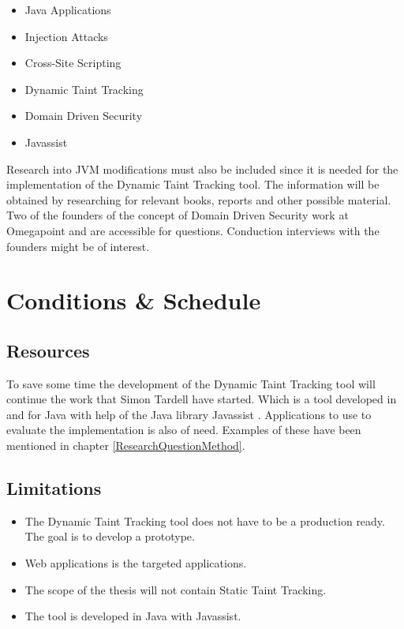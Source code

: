 \documentclass{../kththesis}
\begin{document}
		\begin{itemize}  
			\item Java Applications
			\item Injection Attacks
			\item Cross-Site Scripting
			\item Dynamic Taint Tracking
			\item Domain Driven Security
			\item Javassist
		\end{itemize}
	
	\noindent
	Research into JVM modifications must also be included since it is needed for the implementation of the Dynamic Taint Tracking tool. The information will be obtained by researching for relevant books, reports and other possible material. Two of the founders of the concept of Domain Driven Security work at Omegapoint and are accessible for questions. Conduction interviews with the founders might be of interest.
	
	
	
	\chapter{Conditions \& Schedule}
	\section{Resources}
	To save some time the development of the Dynamic Taint Tracking tool will continue the work that Simon Tardell have started. Which is a tool developed in and for Java with help of the Java library Javassist \parencite{Javassist}. Applications to use to evaluate the implementation is also of need. Examples of these have been mentioned in chapter \ref{ResearchQuestionMethod}.
	
	
	\section{Limitations}
	\begin{itemize}  
		\item The Dynamic Taint Tracking tool does not have to be a production ready. The goal is to develop a prototype.
		\item Web applications is the targeted applications.
		\item The scope of the thesis will not contain Static Taint Tracking.
		\item The tool is developed in Java with Javassist.
	\end{itemize}
	
\end{document}
